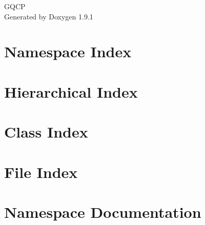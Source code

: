 \let\mypdfximage\pdfximage\def\pdfximage{\immediate\mypdfximage}\documentclass[twoside]{book}
\newcommand{\+}{\discretionary{\mbox{\scriptsize$\hookleftarrow$}}{}{}}
\newcommand{\clearemptydoublepage}{%
  \newpage{\pagestyle{empty}\cleardoublepage}%
}
\begin{document}
\raggedbottom

\hypersetup{pageanchor=false,
             bookmarksnumbered=true,
             pdfencoding=unicode
            }
\begin{titlepage}
\vspace*{7cm}
\begin{center}%
{\Large GQCP }\\
\vspace*{1cm}
{\large Generated by Doxygen 1.9.1}\\
\end{center}
\end{titlepage}
\clearemptydoublepage
{}
\tableofcontents
\clearemptydoublepage
{}
\hypersetup{pageanchor=true}

\chapter{Namespace Index}

\chapter{Hierarchical Index}

\chapter{Class Index}

\chapter{File Index}

\chapter{Namespace Documentation}














\end{document}
